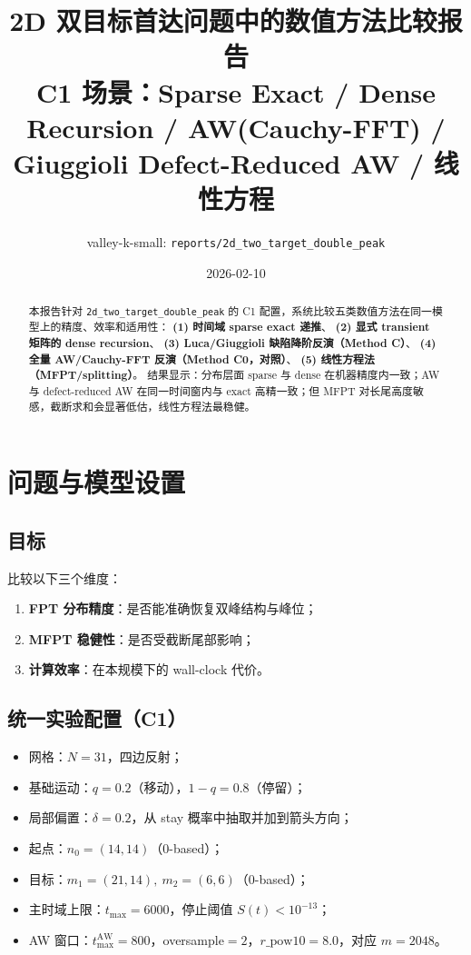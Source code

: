 \documentclass[11pt,a4paper]{ctexart}
\title{2D 双目标首达问题中的数值方法比较报告\\
\large C1 场景：Sparse Exact / Dense Recursion / AW(Cauchy-FFT) / Giuggioli Defect-Reduced AW / 线性方程}
\author{valley-k-small: \texttt{reports/2d\_two\_target\_double\_peak}}
\date{2026-02-10}
\begin{document}
\sloppy
\maketitle

\begin{abstract}
本报告针对 \texttt{2d\_two\_target\_double\_peak} 的 C1 配置，系统比较五类数值方法在同一模型上的精度、效率和适用性：
\textbf{(1) 时间域 sparse exact 递推}、
\textbf{(2) 显式 transient 矩阵的 dense recursion}、
\textbf{(3) Luca/Giuggioli 缺陷降阶反演（Method C）}、
\textbf{(4) 全量 AW/Cauchy-FFT 反演（Method C0，对照）}、
\textbf{(5) 线性方程法（MFPT/splitting）}。
结果显示：分布层面 sparse 与 dense 在机器精度内一致；AW 与 defect-reduced AW 在同一时间窗内与 exact 高精一致；但 MFPT 对长尾高度敏感，截断求和会显著低估，线性方程法最稳健。
\end{abstract}

\section{问题与模型设置}
\subsection{目标}
比较以下三个维度：
\begin{enumerate}[leftmargin=2em]
  \item \textbf{FPT 分布精度}：是否能准确恢复双峰结构与峰位；
  \item \textbf{MFPT 稳健性}：是否受截断尾部影响；
  \item \textbf{计算效率}：在本规模下的 wall-clock 代价。
\end{enumerate}

\subsection{统一实验配置（C1）}
\begin{itemize}[leftmargin=2em]
  \item 网格：$N=31$，四边反射；
  \item 基础运动：$q=0.2$（移动），$1-q=0.8$（停留）；
  \item 局部偏置：$\delta=0.2$，从 stay 概率中抽取并加到箭头方向；
  \item 起点：$n_0=(14,14)$（0-based）；
  \item 目标：$m_1=(21,14),\ m_2=(6,6)$（0-based）；
  \item 主时域上限：$t_{\max}=6000$，停止阈值 $S(t)<10^{-13}$；
  \item AW 窗口：$t_{\max}^{\mathrm{AW}}=800$，oversample$=2$，$r\_\text{pow10}=8.0$，对应 $m=2048$。
\end{itemize}
\end{document}
